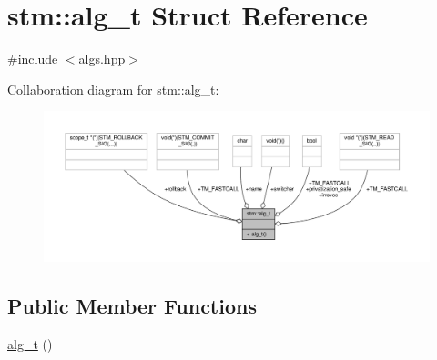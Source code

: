 \hypertarget{structstm_1_1alg__t}{\section{stm\-:\-:alg\-\_\-t Struct Reference}
\label{structstm_1_1alg__t}
}


{\ttfamily \#include $<$algs.\-hpp$>$}



Collaboration diagram for stm\-:\-:alg\-\_\-t\-:
\nopagebreak
\begin{figure}[H]
\begin{center}
\leavevmode
\includegraphics[width=350pt]{structstm_1_1alg__t__coll__graph}
\end{center}
\end{figure}
\subsection*{Public Member Functions}
\begin{DoxyCompactItemize}
\item 
\hyperlink{structstm_1_1alg__t_a1f1317602823c80286ab3b34f851c765}{alg\-\_\-t} ()
\end{DoxyCompactItemize}
